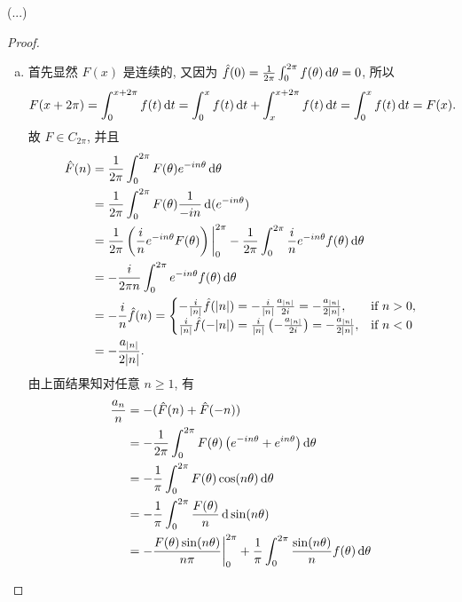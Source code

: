 \begin{exercise}
  (...)
\end{exercise}

\begin{proof}
  \begin{enumerate}[(a)]
      \item 首先显然 $F(x)$ 是连续的, 又因为 $\hat{f}(0)=\frac{1}{2\pi}\int_0^{2\pi}f(\theta)\mathop{}\!\mathrm{d}\theta=0$, 所以
      \[F(x+2\pi) = \int_0^{x+2\pi}f(t)\mathop{}\!\mathrm{d} t
        = \int_0^xf(t)\mathop{}\!\mathrm{d} t+\int_x^{x+2\pi}f(t)\mathop{}\!\mathrm{d} t = \int_0^xf(t)\mathop{}\!\mathrm{d} t = F(x).\]
      故 $F\in C_{2\pi}$, 并且
      \[\begin{split}
        \hat{F}(n)
        & = \frac{1}{2\pi}\int_0^{2\pi}F(\theta)e^{-in\theta}\mathop{}\!\mathrm{d}\theta \\
        & = \frac{1}{2\pi}\int_0^{2\pi}F(\theta)\frac{1}{-in}\mathop{}\!\mathrm{d}(e^{-in\theta}) \\
        & = \frac{1}{2\pi}\left(\frac{i}{n}e^{-in\theta}F(\theta)\right)
            \bigg|_0^{2\pi}-\frac{1}{2\pi}\int_0^{2\pi}\frac{i}{n}e^{-in\theta}f(\theta)\mathop{}\!\mathrm{d}\theta\\
        & = -\frac{i}{2\pi n}\int_0^{2\pi}e^{-in\theta}f(\theta)\mathop{}\!\mathrm{d}\theta \\
        & = -\frac{i}{n}\hat{f}(n)
          = \begin{cases}
            -\frac{i}{|n|}\hat{f}(|n|)
              = -\frac{i}{|n|}\frac{a_{|n|}}{2i} = -\frac{a_{|n|}}{2|n|},
            & \text{if } n>0, \\
            \frac{i}{|n|}\hat{f}(-|n|)=\frac{i}{|n|}\left(-\frac{a_{|n|}}{2i}\right)
              = -\frac{a_{|n|}}{2|n|},
            & \text{if } n<0
            \end{cases} \\
        & = -\frac{a_{|n|}}{2|n|}.
      \end{split}\]
      由上面结果知对任意 $n\geq 1$, 有
      \[\begin{split}
        \frac{a_n}{n}
        & = -(\hat{F}(n)+\hat{F}(-n)) \\
        & = -\frac{1}{2\pi}\int_0^{2\pi}F(\theta)\left(e^{-in\theta}+e^{in\theta}\right)\diff\theta\\
        & = -\frac{1}{\pi}\int_0^{2\pi}F(\theta)\cos(n\theta)\diff\theta \\
        & = -\frac{1}{\pi}\int_0^{2\pi}\frac{F(\theta)}{n}\diff\sin(n\theta) \\
        & = -\frac{F(\theta)\sin(n\theta)}{n\pi}\bigg|_0^{2\pi}
            + \frac{1}{\pi}\int_0^{2\pi}\frac{\sin(n\theta)}{n}f(\theta)\diff\theta \\

\end{split}\]
\end{enumerate}
\end{proof}
